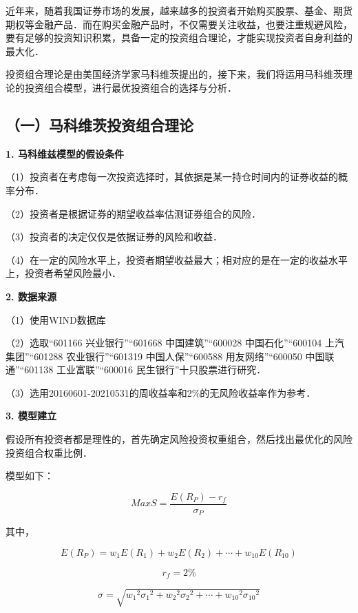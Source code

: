 
近年来，随着我国证券市场的发展，越来越多的投资者开始购买股票、基金、期货期权等金融产品．而在购买金融产品时，不仅需要关注收益，也要注重规避风险，要有足够的投资知识积累，具备一定的投资组合理论，才能实现投资者自身利益的最大化．

投资组合理论是由美国经济学家马科维茨提出的，接下来，我们将运用马科维茨理论的投资组合模型，进行最优投资组合的选择与分析．

\subsection{（一）马科维茨投资组合理论}

\textbf{1. 马科维兹模型的假设条件}

（1）投资者在考虑每一次投资选择时，其依据是某一持仓时间内的证券收益的概率分布．

（2）投资者是根据证券的期望收益率估测证券组合的风险．

（3）投资者的决定仅仅是依据证券的风险和收益．

（4）在一定的风险水平上，投资者期望收益最大；相对应的是在一定的收益水平上，投资者希望风险最小．

\textbf{2.	数据来源}

（1）使用WIND数据库

（2）选取“601166 兴业银行”“601668 中国建筑”“600028 中国石化”“600104 上汽集团”“601288 农业银行”“601319 中国人保”“600588 用友网络”“600050 中国联通”“601138 工业富联”“600016 民生银行”十只股票进行研究．

（3）选用20160601-20210531的周收益率和2\%的无风险收益率作为参考．

\textbf{3.	模型建立}

假设所有投资者都是理性的，首先确定风险投资权重组合，然后找出最优化的风险投资组合权重比例．

模型如下：

\begin{equation}
Max S=\frac {E(R_P)-r_f}{\sigma_P}
\end{equation}

其中，

\begin{equation}
E(R_P)=w_1E(R_1)+w_2E(R_2)+\cdots+w_{10}E(R_{10})
\end{equation}

\begin{equation}
r_f=2\%
\end{equation}

\begin{equation}
\sigma=\sqrt{{w_1}^2 {\sigma_1}^2 + {w_2}^2 {\sigma_2}^2 + \cdots +{w_{10}}^2 {\sigma_{10}}^2}
\end{equation}

